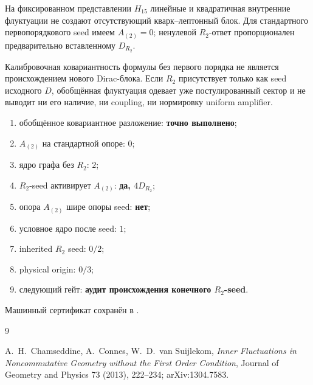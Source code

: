 \begin{theorem}
На фиксированном представлении $H_{15}$ линейные и квадратичная внутренние
флуктуации не создают отсутствующий кварк--лептонный блок. Для стандартного
первопорядкового seed имеем $A_{(2)}=0$; ненулевой $R_2$-ответ
пропорционален предварительно вставленному $D_{R_2}$.
\end{theorem}

\begin{nogocriterion}
Калибровочная ковариантность формулы без первого порядка не является
происхождением нового Dirac-блока. Если $R_2$ присутствует только как seed
исходного $D$, обобщённая флуктуация одевает уже постулированный сектор и не
выводит ни его наличие, ни coupling, ни нормировку uniform amplifier.
\end{nogocriterion}

\begin{protocol}\begin{enumerate}
\item обобщённое ковариантное разложение: \textbf{точно выполнено};
\item $A_{(2)}$ на стандартной опоре: \textbf{$0$};
\item ядро графа без $R_2$: \textbf{$2$};
\item $R_2$-seed активирует $A_{(2)}$: \textbf{да, $4D_{R_2}$};
\item опора $A_{(2)}$ шире опоры seed: \textbf{нет};
\item условное ядро после seed: \textbf{$1$};
\item inherited $R_2$ seed: \textbf{$0/2$};
\item physical origin: \textbf{$0/3$};
\item следующий гейт: \textbf{аудит происхождения конечного $R_2$-seed}.
\end{enumerate}\end{protocol}

Машинный сертификат сохранён в
.

\begin{thebibliography}{9}\raggedright
{}
A.~H.~Chamseddine, A.~Connes, W.~D.~van Suijlekom,
\emph{Inner Fluctuations in Noncommutative Geometry without the First Order Condition},
Journal of Geometry and Physics 73 (2013), 222--234; arXiv:1304.7583.
\end{thebibliography}